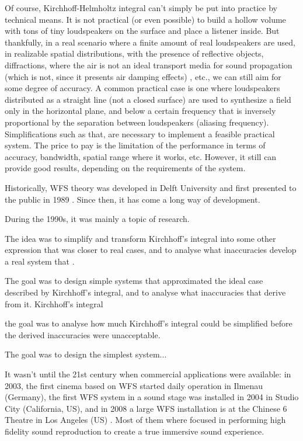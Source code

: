 Of course, Kirchhoff-Helmholtz integral can't simply be put into practice by technical means. It is not practical (or even possible) to build a hollow volume with tons of tiny loudspeakers on the surface and place a listener inside.
But thankfully, in a real scenario where a finite amount of real loudspeakers are used, in realizable spatial distributions, with the presence of reflective objects, diffractions, where the air is not an ideal transport media for sound propagation (which is not, since it presents air damping effects)%
, etc., we can still aim for some degree of accuracy.
A common practical case is one where loudspeakers distributed as a straight line (not a closed surface) are used to synthesize a field only in the horizontal plane, and below a certain frequency that is inversely proportional by the separation between loudspeakers (aliasing frequency). Simplifications such as that, are necessary to implement a feasible practical system. The price to pay is the limitation of the performance in terms of accuracy, bandwidth, spatial range where it works, etc. However, it still can provide good results, depending on the requirements of the system.

Historically, WFS theory was developed in Delft University and first presented to the public in 1989 \cite{berkhout1989acoustic}. Since then, it has come a long way of development.

During the 1990s, it was mainly a topic of research. 

The idea was to simplify and transform Kirchhoff's integral into some other expression that was closer to real cases, and to analyse what inaccuracies  develop a real system that .

The goal was to design simple systems that approximated the ideal case described by Kirchhoff's integral, and to analyse what inaccuracies that derive from it. Kirchhoff's integral 

the goal was to analyse how much Kirchhoff's integral could be simplified before the derived inaccuracies were unacceptable.

The goal was to design the simplest system...

It wasn't until the 21st century when commercial applications were available: in 2003, the first cinema based on WFS started daily operation in Ilmenau (Germany), the first WFS system in a sound stage was installed in 2004 in Studio City (California, US), and in 2008 a large WFS installation is at the Chinese 6 Theatre in Los Angeles (US) \cite{Brandenburg2009}. Most of them where focused in performing high fidelity sound reproduction to create a true immersive sound experience.

